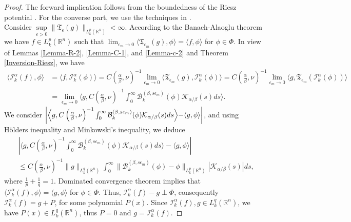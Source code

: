 \documentclass[11pt,a4paper,reqno]{amsproc}
\theoremstyle{definition}
\theoremstyle{remark}
\numberwithin{equation}{section}
\begin{document}
\begin{proof}
    The forward implication follows from the boundedness of the Riesz potential \cite{Hassani}.  For the converse part, we use the techniques in \cite{Sezer}.
    \\ Consider $\underset{\epsilon>0}{\sup} \| \mathfrak{T}_\epsilon (g)\|_{L_k^p(\mathbb{R}^n)} < \infty$. According to the Banach-Alaoglu theorem we have $f\in L_k^p(\mathbb{R}^n)$ such that $\lim_{\epsilon_m \rightarrow 0}\langle  \mathfrak{T}_{\epsilon_m} (g) , \phi \rangle = \langle f, \phi \rangle$ for $\phi \in \Phi$. In view of Lemmas \ref{Lemma-R-2}, \ref{Lemma-C-1}, and \ref{Lemma-c-2} and Theorem \ref{Inversion-Riesz}, we have 
    \begin{align*}
        \langle \mathcal{I}_k^\alpha(f), \phi \rangle & = \langle f , \mathcal{I}_k^\alpha(\phi) \rangle = {C\left(\frac{\alpha}{\beta},\nu\right)}^{-1}\underset{\epsilon_m \rightarrow 0}{\lim} \langle \mathfrak{T}_{\epsilon_m}(g),  \mathcal{I}_k^\alpha(\phi) \rangle =  {C\left(\frac{\alpha}{\beta},\nu\right)}^{-1}\underset{\epsilon_m \rightarrow 0}{\lim} \langle g, \mathfrak{T}_{\epsilon_m}(
        \mathcal{I}_k^\alpha(\phi)) \rangle \\
        & = \underset{\epsilon_m \rightarrow 0}{\lim} 
       \Biggl \langle   g,  {C\left(\frac{\alpha}{\beta},\nu\right)}^{-1} \int_0^\infty \mathcal{B}_k^{(\beta, s\epsilon_m )}(\phi) \mathcal{K}_{\alpha/\beta}(s) ds
      \Biggl  \rangle .
    \end{align*}
We consider $   \left|  \Bigl \langle   g,  {C\left(\frac{\alpha}{\beta},\nu\right)}^{-1} \int_0^\infty \mathcal{B}_k^{(\beta, s\epsilon_m )}(\phi) \mathcal{K}_{\alpha/\beta}(s) ds
      \Bigl  \rangle -\langle g, \phi \rangle
      \right| $, and using H\"olders inequality and Minkowski's inequality, we deduce 
 \begin{align*}
   &\left|  \Biggl \langle   g,  {C\left(\frac{\alpha}{\beta},\nu\right)}^{-1} \int_0^\infty \mathcal{B}_k^{(\beta, s\epsilon_m )}(\phi) \mathcal{K}_{\alpha/\beta}(s) ds
      \Biggl  \rangle -\langle g, \phi \rangle
      \right|\\
      &\leq {C\left(\frac{\alpha}{\beta},\nu\right)}^{-1} \|g\|_{L_k^q(\mathbb{R}^n)} \int_0^\infty \| \mathcal{B}_k^{(\beta, s\epsilon_m)}(\phi)-\phi\|_{L_k^p(\mathbb{R}^n)} \left| \mathcal{K}_{\alpha/\beta}(s) 
      \right|ds,
 \end{align*}where $\frac{1}{p}+\frac{1}{q}=1$.  Dominated convergence theorem implies that $\langle \mathcal{I}_k^\alpha( f), \phi \rangle=\langle g, \phi \rangle$
for $\phi \in \Phi$. Thus, $\mathcal{I}_k^\alpha (f) - g \perp \Phi$, consequently $\mathcal{I}_k^\alpha(f)= g+ P$, for some polynomial $P(x)$. Since $\mathcal{I}_k^\alpha(f), g \in L_k^q(\mathbb{R}^n)$, we have $P(x)\in L_k^q(\mathbb{R}^n)$, thus $P=0$ and $g = \mathcal{I}_k^\alpha(f)$. 
\end{proof}
\end{document}
